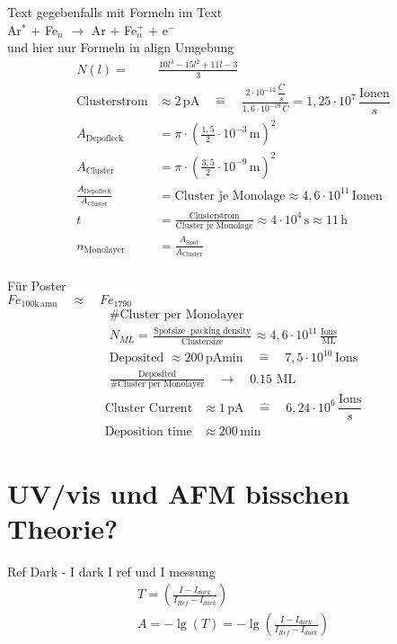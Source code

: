 Text gegebenfalls mit Formeln im Text \\
Ar$^*$ + Fe$_n$ $\rightarrow $ Ar + Fe$^+_{n}$ + e$^-$ \\
und hier nur Formeln in align Umgebung\\
\begin{align}
  N(l)=&\frac{10l^3 -15l^2 + 11l -3}{3} \\
  \text{Clusterstrom}&\approx 2\,\text{pA} \quad \widehat{=} \quad \frac{2\cdot10^{-12}\,\dfrac{C}{s}}{1,6\cdot10^{-19}\,C} = 1,25\cdot10^7 \,\dfrac{\text{Ionen}}{s} \\
  A_{\text{Depofleck}}&=\pi\cdot(\frac{1,5}{2}\cdot10^{-3}\,\text{m})^2 \\
  A_{\text{Cluster}}&=\pi\cdot(\frac{3,5}{2}\cdot10^{-9}\,\text{m})^2 \\
  \frac{A_{\text{Depofleck}}}{A_{\text{Cluster}}}&= \text{Cluster je Monolage}\approx 4,6\cdot10^{11} \,\text{Ionen}\\
  t&=\frac{\text{Clusterstrom}}{\text{Cluster je Monolage}}\approx 4\cdot10^4\,\text{s} \approx 11\,\text{h} \\
  n_{\text{Monolayer}}&=\frac{A_{\text{Spot}}}{A_{\text{Cluster}}}
\end{align}
\blindtext \\
Für Poster \\
$Fe_{100\text{k}\,\text{amu}} \quad\approx\quad Fe_{1790} $
\begin{align*}
 \text{\#Cluster per Monolayer}\\
 N_{ML}=\frac{\text{Spotsize$\,\cdot\,$packing density}}{\text{Clustersize}} \approx  4,6\cdot10^{11}\,\frac{\text{Ions}}{\text{ML}} \\
 \text{Deposited $\approx 200\,$pAmin}\quad \widehat{=} \quad  7,5\cdot10^{10} \,\text{Ions} \\
 \frac{\text{Deposited}}{\text{\#Cluster per Monolayer}}\quad \rightarrow \quad 0.15\,\,\text{ML}
\end{align*}
\begin{align}
 \text{Cluster Current}&\approx 1\,\text{pA} \quad \widehat{=} \quad 6,24\cdot10^6 \,\dfrac{\text{Ions}}{s} \\
 \text{Deposition time}&\approx 200\,\text{min} 
\end{align}

\section{UV/vis und AFM bisschen Theorie?}
Ref Dark - I dark I ref und I messung
\begin{align*}
    T=\left(\frac{I-I_{dark}}{I_{Ref}-I_{dark}}\right)\\
    A=- \lg\left(T\right) = -\lg\left(\frac{I-I_{dark}}{I_{Ref}-I_{dark}}\right)
\end{align*}
